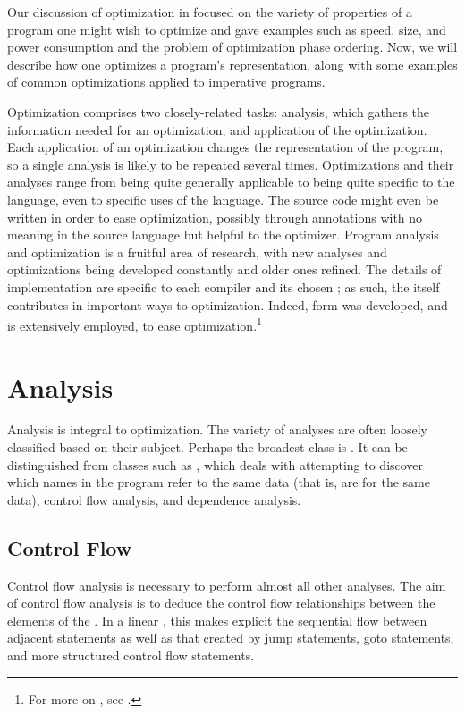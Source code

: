 \label{imperative:optimizing}
Our discussion of optimization in  focused on the variety of properties of a program one might wish to optimize and gave examples such as speed, size, and power consumption and the problem of optimization phase ordering. Now, we will describe how one optimizes a program's representation, along with some examples of common optimizations applied to imperative programs.

Optimization comprises two closely-related tasks: analysis, which gathers the information needed for an optimization, and application of the optimization. Each application of an optimization changes the representation of the program, so a single analysis is likely to be repeated several times. Optimizations and their analyses range from being quite generally applicable to being quite specific to the language, even to specific uses of the language. The source code might even be written in order to ease optimization, possibly through annotations with no meaning in the source language but helpful to the optimizer. Program analysis and optimization is a fruitful area of research, with new analyses and optimizations being developed constantly and older ones refined. The details of implementation are specific to each compiler and its chosen \IRs{}; as such, the \IR itself contributes in important ways to optimization. Indeed, \SSA[long] form was developed, and is extensively employed, to ease optimization.\footnote{For more on \SSA{}, see .}

\section{Analysis}
Analysis is integral to optimization. The variety of analyses are often loosely classified based on their subject. Perhaps the broadest class is . It can be distinguished from classes such as , which deals with attempting to discover which names in the program refer to the same data (that is, are  for the same data), control flow analysis, and dependence analysis.

\subsection{Control Flow}
Control flow analysis is necessary to perform almost all other analyses. The aim of control flow analysis is to deduce the control flow relationships between the elements of the \IR{}. In a linear , this makes explicit the sequential flow between adjacent statements as well as that created by jump statements, goto statements, and more structured control flow statements.


